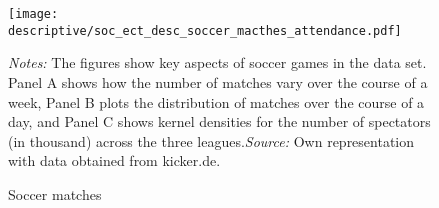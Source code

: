 \documentclass[11pt, a4paper]{article} %
\begin{document}
\vspace*{\fill}
\begin{figure}[H]\centering
	\caption{Soccer matches}\label{fig_soc_ext:descriptives_matches_time_attendance}
	\texttt{[image: descriptive/soc\_ect\_desc\_soccer\_macthes\_attendance.pdf]}	
	\begin{minipage}{\linewidth}
		\scriptsize{\emph{Notes:} The figures show key aspects of soccer games in the data set. Panel A shows how the number of matches vary over the course of a week, Panel B plots the distribution of matches over the course of a day, and Panel C shows kernel densities for the number of spectators (in thousand) across the three leagues.\newline \emph{Source:} Own representation with data obtained from kicker.de.}
	\end{minipage}
\end{figure}
\vspace*{\fill}\clearpage
\end{document}
